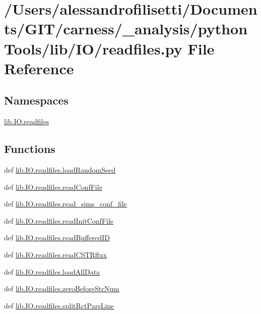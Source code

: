 \hypertarget{a00093}{\section{/\-Users/alessandrofilisetti/\-Documents/\-G\-I\-T/carness/\-\_\-analysis/python\-Tools/lib/\-I\-O/readfiles.py File Reference}
\label{a00093}
}
\subsection*{Namespaces}
\begin{DoxyCompactItemize}
\item 
\hyperlink{a00144}{lib.\-I\-O.\-readfiles}
\end{DoxyCompactItemize}
\subsection*{Functions}
\begin{DoxyCompactItemize}
\item 
def \hyperlink{a00144_a35bd9157c0887704488cc0e2c50bf127}{lib.\-I\-O.\-readfiles.\-load\-Random\-Seed}
\item 
def \hyperlink{a00144_aa0985f97c9159003c7a4bd44d1a989f3}{lib.\-I\-O.\-readfiles.\-read\-Conf\-File}
\item 
def \hyperlink{a00144_a05887f4cca56e48fcb1be55b6b8f5a9b}{lib.\-I\-O.\-readfiles.\-read\-\_\-sims\-\_\-conf\-\_\-file}
\item 
def \hyperlink{a00144_af8a2deca70e9e04a4c4812d81430df19}{lib.\-I\-O.\-readfiles.\-read\-Init\-Conf\-File}
\item 
def \hyperlink{a00144_a4a56e157e25982ad4a7dedd03929dcd6}{lib.\-I\-O.\-readfiles.\-read\-Buffered\-I\-D}
\item 
def \hyperlink{a00144_ab6d9ae4f9d3c52b2aad8b50d9b110dc1}{lib.\-I\-O.\-readfiles.\-read\-C\-S\-T\-Rflux}
\item 
def \hyperlink{a00144_a5ddfb684cfa43cb2aa2d8246078c486c}{lib.\-I\-O.\-readfiles.\-load\-All\-Data}
\item 
def \hyperlink{a00144_a30cdb91109c2d6ea6e0abb808fe88c6f}{lib.\-I\-O.\-readfiles.\-zero\-Before\-Str\-Num}
\item 
def \hyperlink{a00144_a3a9416927822cf24fb30e1d57bf71412}{lib.\-I\-O.\-readfiles.\-split\-Rct\-Pars\-Line}
\end{DoxyCompactItemize}
